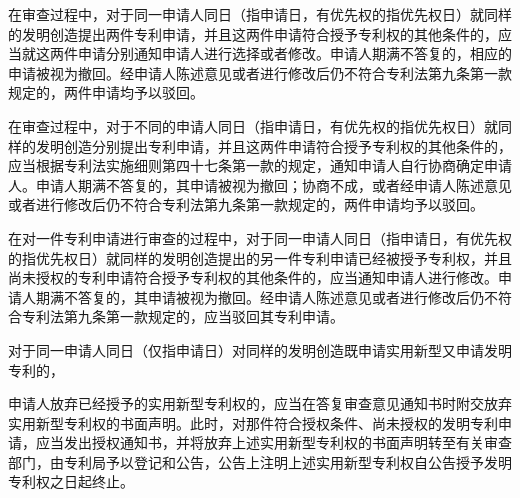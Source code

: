 在审查过程中，对于同一申请人同日（指申请日，有优先权的指优先权日）就同样的发明创造提出两件专利申请，并且这两件申请符合授予专利权的其他条件的，应当就这两件申请分别通知申请人进行选择或者修改。申请人期满不答复的，相应的申请被视为撤回。经申请人陈述意见或者进行修改后仍不符合专利法第九条第一款规定的，两件申请均予以驳回。

在审查过程中，对于不同的申请人同日（指申请日，有优先权的指优先权日）就同样的发明创造分别提出专利申请，并且这两件申请符合授予专利权的其他条件的，应当根据专利法实施细则第四十七条第一款的规定，通知申请人自行协商确定申请人。申请人期满不答复的，其申请被视为撤回；协商不成，或者经申请人陈述意见或者进行修改后仍不符合专利法第九条第一款规定的，两件申请均予以驳回。

在对一件专利申请进行审查的过程中，对于同一申请人同日（指申请日，有优先权的指优先权日）就同样的发明创造提出的另一件专利申请已经被授予专利权，并且尚未授权的专利申请符合授予专利权的其他条件的，应当通知申请人进行修改。申请人期满不答复的，其申请被视为撤回。经申请人陈述意见或者进行修改后仍不符合专利法第九条第一款规定的，应当驳回其专利申请。

对于同一申请人同日（仅指申请日）对同样的发明创造既申请实用新型又申请发明专利的，

申请人放弃已经授予的实用新型专利权的，应当在答复审查意见通知书时附交放弃实用新型专利权的书面声明。此时，对那件符合授权条件、尚未授权的发明专利申请，应当发出授权通知书，并将放弃上述实用新型专利权的书面声明转至有关审查部门，由专利局予以登记和公告，公告上注明上述实用新型专利权自公告授予发明专利权之日起终止。

